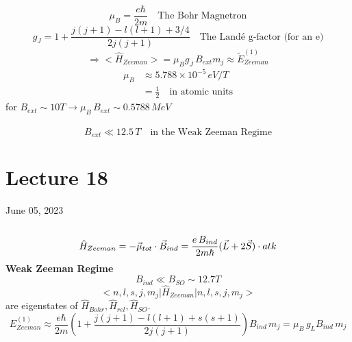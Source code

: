 \documentclass[12pt,fancychapters]{report}
\numberwithin{equation}{section}
\begin{document}
\[
\boxed{\mu_B = \frac{e\hbar}{2m}\quad \text{The Bohr Magnetron}}
\]
\[
\boxed{g_J = 1 + \frac{j(j+1) - l(l+1) + 3/4}{2j(j+1)}\quad\text{The Landé g-factor (for an e)}}
\]
\[
  \Rightarrow \big<\hat{H}_{Zeeman}\big> = \mu_B g_J\,B_{ext}m_j \approx \tilde{E}^{(1)}_{Zeeman}
\]
\begin{align*}
  \mu_B &\approx 5.788\times 10^{-5}\,eV/T\\
        &= \frac{1}{2}\quad\text{in atomic units} 
\end{align*}
for $B_{ext}\sim 10T \rightarrow \mu_B\,B_{ext} \sim 0.5788\,MeV$\\
\\
\[
  B_{ext} \ll 12.5\,T\quad \text{in the Weak Zeeman Regime}
\]
\newpage
\section{Lecture 18}
June 05, 2023\\
\\
\[
  \hat{H}_{Zeeman} = -\vec{\mu}_{tot}\cdot \vec{B}_{ind} =
  \frac{e\,B_{ind}}{2m\hbar}(\vec{L}+2\vec{S})\cdot \\at{k}
\]
\textbf{Weak Zeeman Regime}
\[
  B_{ind} \ll B_{SO} \sim 12.7T
\]
\[
  \big<n, l, s, j, m_j\big|\hat{H}_{Zeeman}\big|n, l, s, j, m_j\big>
\]
are eigenstates of $\hat{H}_{Bohr}, \hat{H}_{rel}, \hat{H}_{SO}$.
\[
  E_{Zeeman}^{(1)} \approx \frac{e\hbar}{2m}\left(1+\frac{j(j+1)-l(l+1)+s(s+1)}{2j(j+1)}\right)
  B_{ind}\,m_j = \mu_B\,g_L B_{ind}\,m_j
\]
\end{document}
